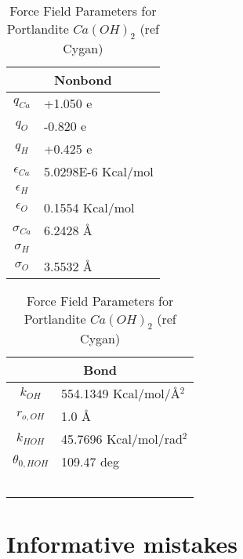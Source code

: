 \documentclass[twoside,english]{uiofysmaster}
\begin{document}
\begin{table}
 \caption{Force Field Parameters for Portlandite $Ca(OH)_2$ (ref Cygan)}
  \begin{tabular}[]{|c|l|}
  \hline
  \multicolumn{2}{|c|}{Nonbond} \\ \hline
  $q_{Ca}$ & +1.050 e  \\ \hline
  $q_O$ & -0.820 e  \\ \hline
  $q_H$ & +0.425 e  \\ \hline

  $\epsilon _{Ca}$ & 5.0298E-6 Kcal/mol \\ \hline
  $\epsilon _H$ &  \\ \hline
  $\epsilon _O$ & 0.1554 Kcal/mol \\ \hline
  $\sigma _{Ca}$ & 6.2428 \AA{} \\ \hline
  $\sigma _H$ &  \\ \hline
  $\sigma _O$ & 3.5532 \AA{} \\ \hline
 \end{tabular}
  \begin{tabular}[]{|c|l|}
  \hline
  \multicolumn{2}{|c|}{Bond} \\ \hline
  $k_{OH}$ & 554.1349 Kcal/mol/\AA{}$^2$  \\ \hline
  $r_{o,OH}$ & 1.0 \AA{}  \\ \hline
  $k_{HOH}$ & 45.7696 Kcal/mol/rad$^2$ \\ \hline
  $\theta _{0,HOH}$ & 109.47 deg \\ \hline
                    &           \\ \hline
                    &           \\ \hline
		    &           \\ \hline
                    &           \\ \hline
                    &           \\ \hline

 \end{tabular}
 \label{ForceFieldParameters_Portlandite}
\end{table}

\section{Informative mistakes}
\end{document}
